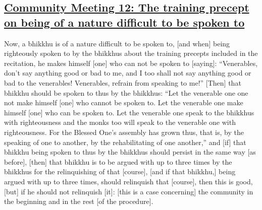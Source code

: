 \subsection*{\hyperref[sd12]{Community Meeting 12: The training precept on being of a nature difficult to be spoken to}}
\label{comm12}
Now, a bhikkhu is of a nature difficult to be spoken to, [and when] being righteously spoken to by the bhikkhus about the training precepts included in the recitation, he makes himself [one] who can not be spoken to [saying]: ``Venerables, don't say anything good or bad to me, and I too shall not say anything good or bad to the venerables! Venerables, refrain from speaking to me!'' [Then] that bhikkhu should be spoken to thus by the bhikkhus: ``Let the venerable one one not make himself [one] who cannot be spoken to. Let the venerable one make himself [one] who can be spoken to. Let the venerable one speak to the bhikkhus with righteousness and the monks too will speak to the venerable one with righteousness. For the Blessed One's assembly has grown thus, that is, by the speaking of one to another, by the rehabilitating of one another,'' and [if] that bhikkhu being spoken to thus by the bhikkhus should persist in the same way [as before], [then] that bhikkhu is to be argued with up to three times by the bhikkhus for the relinquishing of that [course], [and if that bhikkhu,] being argued with up to three times, should relinquish that [course], then this is good, [but] if he should not relinquish [it]: [this is a case concerning] the community in the beginning and in the rest [of the procedure].

